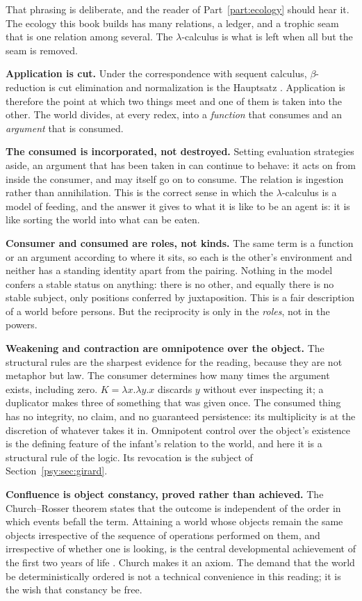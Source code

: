 That phrasing is deliberate, and the reader of Part~\ref{part:ecology}
should hear it.
The ecology this book builds has many relations, a ledger, and a
trophic seam that is one relation among several.
The $\lambda$-calculus is what is left when all but the seam is
removed.

\textbf{Application is cut.}
Under the correspondence with sequent calculus, $\beta$-reduction is
cut elimination and normalization is the Hauptsatz
\cite{gentzen1935,howard1980}.
Application is therefore the point at which two things meet and one
of them is taken into the other.
The world divides, at every redex, into a \emph{function} that
consumes and an \emph{argument} that is consumed.

\textbf{The consumed is incorporated, not destroyed.}
Setting evaluation strategies aside, an argument that has been taken
in can continue to behave: it acts on from inside the consumer, and
may itself go on to consume.
The relation is ingestion rather than annihilation.
This is the correct sense in which the $\lambda$-calculus is a model
of feeding, and the answer it gives to what it is like to be an
agent is: it is like sorting the world into what can be eaten.

\textbf{Consumer and consumed are roles, not kinds.}
The same term is a function or an argument according to where it
sits, so each is the other's environment and neither has a standing
identity apart from the pairing.
Nothing in the model confers a stable status on anything: there is
no other, and equally there is no stable subject, only positions
conferred by juxtaposition.
This is a fair description of a world before persons.
But the reciprocity is only in the \emph{roles}, not in the powers.

\textbf{Weakening and contraction are omnipotence over the object.}
The structural rules are the sharpest evidence for the reading,
because they are not metaphor but law.
The consumer determines how many times the argument exists,
including zero.
$K = \lambda x.\lambda y.x$ discards $y$ without ever inspecting it;
a duplicator makes three of something that was given once.
The consumed thing has no integrity, no claim, and no guaranteed
persistence: its multiplicity is at the discretion of whatever takes
it in.
Omnipotent control over the object's existence is the defining
feature of the infant's relation to the world, and here it is a
structural rule of the logic.
Its revocation is the subject of Section~\ref{psy:sec:girard}.

\textbf{Confluence is object constancy, proved rather than
achieved.}
The Church--Rosser theorem states that the outcome is independent of
the order in which events befall the term.
Attaining a world whose objects remain the same objects irrespective
of the sequence of operations performed on them, and irrespective of
whether one is looking, is the central developmental achievement of
the first two years of life \cite{piaget1954}.
Church makes it an axiom.
The demand that the world be deterministically ordered is not a
technical convenience in this reading; it is the wish that constancy
be free.

